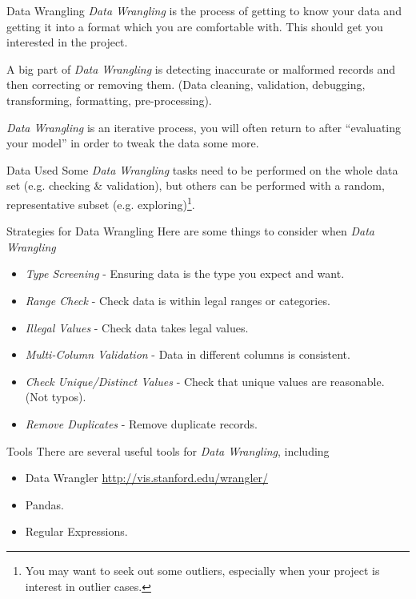 \documentclass[11pt,a4paper]{article}
\begin{document}
  \begin{definition}{Data Wrangling}
    \textit{Data Wrangling} is the process of getting to know your data and getting it into a format which you are comfortable with. This should get you interested in the project.
    \par A big part of \textit{Data Wrangling} is detecting inaccurate or malformed records and then correcting or removing them. (Data cleaning, validation, debugging, transforming, formatting, pre-processing).
    \par \textit{Data Wrangling} is an iterative process, you will often return to after ``evaluating your model'' in order to tweak the data some more.
  \end{definition}

  \begin{remark}{Data Used}
    Some \textit{Data Wrangling} tasks need to be performed on the whole data set (e.g. checking \& validation), but others can be performed with a random, representative subset (e.g. exploring)\footnote{You may want to seek out some outliers, especially when your project is interest in outlier cases.}.
  \end{remark}

  \begin{remark}{Strategies for Data Wrangling}
    Here are some things to consider when \textit{Data Wrangling}
    \begin{itemize}
      \item \textit{Type Screening} - Ensuring data is the type you expect and want.
      \item \textit{Range Check} - Check data is within legal ranges or categories.
      \item \textit{Illegal Values} - Check data takes legal values.
      \item \textit{Multi-Column Validation} - Data in different columns is consistent.
      \item \textit{Check Unique/Distinct Values} - Check that unique values are reasonable. (Not typos).
      \item \textit{Remove Duplicates} - Remove duplicate records.
    \end{itemize}
  \end{remark}

  \begin{remark}{Tools}
    There are several useful tools for \textit{Data Wrangling}, including
    \begin{itemize}
      \item Data Wrangler \url{http://vis.stanford.edu/wrangler/}
      \item Pandas.
      \item Regular Expressions.
    \end{itemize}
  \end{remark}
\end{document}
